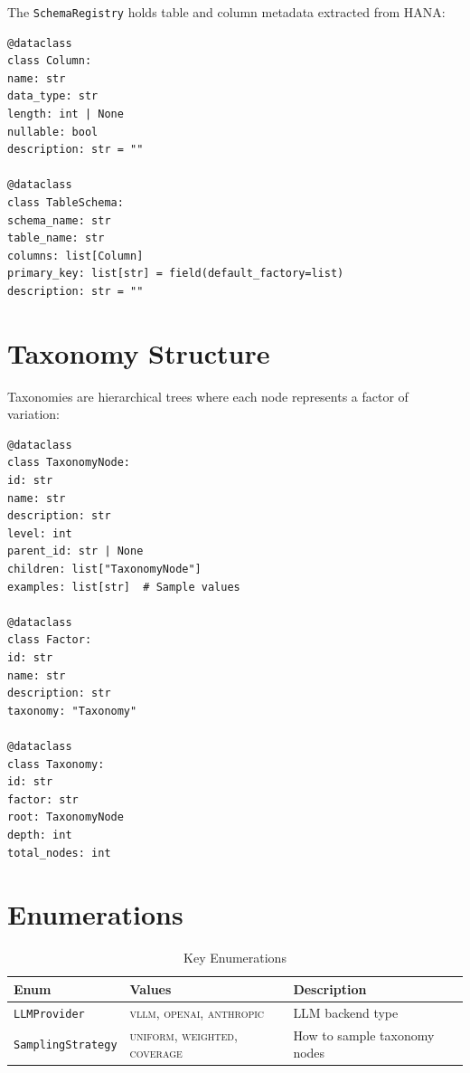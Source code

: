 \documentclass[12pt,a4paper,twoside]{report}
\begin{document}
The \texttt{SchemaRegistry} holds table and column metadata extracted from HANA:

\begin{lstlisting}[language=jsonx,caption={Schema registry structures (schema\_registry.py)}]
@dataclass
class Column:
name: str
data_type: str
length: int | None
nullable: bool
description: str = ""

@dataclass
class TableSchema:
schema_name: str
table_name: str
columns: list[Column]
primary_key: list[str] = field(default_factory=list)
description: str = ""
\end{lstlisting}

\section{Taxonomy Structure}

Taxonomies are hierarchical trees where each node represents a factor of variation:

\begin{lstlisting}[language=jsonx,caption={Taxonomy structures (simula\_taxonomy\_builder.py)}]
@dataclass
class TaxonomyNode:
id: str
name: str
description: str
level: int
parent_id: str | None
children: list["TaxonomyNode"]
examples: list[str]  # Sample values

@dataclass
class Factor:
id: str
name: str
description: str
taxonomy: "Taxonomy"

@dataclass
class Taxonomy:
id: str
factor: str
root: TaxonomyNode
depth: int
total_nodes: int
\end{lstlisting}

\section{Enumerations}

\begin{table}[H]
\centering
\caption{Key Enumerations}
\label{tab:enums}
\begin{tabular}{lll}
\toprule
\textbf{Enum} & \textbf{Values} & \textbf{Description} \\
\midrule
\texttt{LLMProvider} & \textsc{vllm}, \textsc{openai}, \textsc{anthropic} & LLM backend type \\
\texttt{SamplingStrategy} & \textsc{uniform}, \textsc{weighted}, \textsc{coverage} & How to sample taxonomy nodes \\
\bottomrule
\end{tabular}
\end{table}
\end{document}
